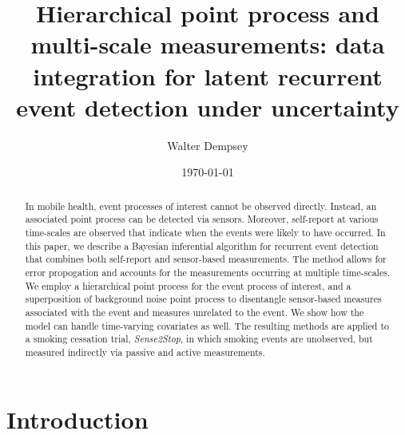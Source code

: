 \documentclass[11pt]{amsart}
\begin{document}
\title[Hierarchical point processes and multi-scale measurements:
 inference for latent event process from multiple sources of
 information]{Hierarchical point process and multi-scale
   measurements: data integration for latent recurrent event
   detection under uncertainty} 
\author{Walter Dempsey}
\address {Department of Statistics, 
  Harvard University, One Oxford Street
   Cambridge, MA  02138, USA}

\date{\today}

\begin{abstract}
In mobile health, event processes of interest cannot be observed
directly. Instead, an associated point process can be detected via
sensors. Moreover, self-report at various time-scales are observed
that indicate when the events were likely to have occurred.
In this paper, we describe a Bayesian inferential algorithm for
recurrent event detection that combines both self-report and
sensor-based measurements.  The method allows for error propogation
and accounts for the measurements occurring at multiple
time-scales. We employ a hierarchical point process for the event
process of interest, and a superposition of background noise point
process to disentangle sensor-based measures associated with the event
and measures unrelated to the event.  We show how the model can handle
time-varying covariates as well. The resulting methods are applied to
a smoking cessation trial, \emph{Sense2Stop}, in which smoking events
are unobserved, but measured indirectly via passive and active
measurements.   
\end{abstract}



\maketitle

\section{Introduction}
\label{section:introduction}
\end{document}
